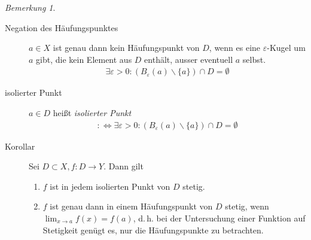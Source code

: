 \documentclass[ngerman,titlepage,twoside, parskip=half*]{scrreprt}
\newcommand*{\perdef}{:\Leftrightarrow}
\theoremstyle{plain}
\theoremstyle{definition}
\theoremstyle{remark}
\newtheorem*{remark}{Bemerkung}
\begin{document}
\begin{remark}
\begin{description}
\item[Negation des Häufungspunktes] $a\in X$ ist genau dann kein
  Häufungspunkt von $D$, wenn es eine $\varepsilon$-Kugel um $a$ gibt,
  die kein Element aus $D$ enthält, ausser eventuell $a$ selbst.
  \begin{gather*}\exists \varepsilon >0\colon(B_{\varepsilon}(a)\backslash \{a\})\cap D=\emptyset\end{gather*}
\item[isolierter Punkt] $a\in D$ heißt \emph{isolierter
    Punkt}
  \begin{gather*}\perdef \exists \varepsilon>0\colon(B_{\varepsilon}(a)\backslash
  \{a\})\cap D=\emptyset\end{gather*}
\item[Korollar] Sei $D\subset X, f\colon D\rightarrow Y$. Dann gilt
  \begin{enumerate}[i]
  \item $f$ ist in jedem isolierten Punkt von $D$ stetig.
  \item $f$ ist genau dann in einem Häufungspunkt von $D$ stetig, wenn
    $\lim_{x\rightarrow a}f(x)=f(a)$, d.\,h. bei der Untersuchung einer
    Funktion auf Stetigkeit genügt es, nur die Häufungspunkte zu
    betrachten.
  \end{enumerate}
\end{description}
\end{remark}
\end{document}
